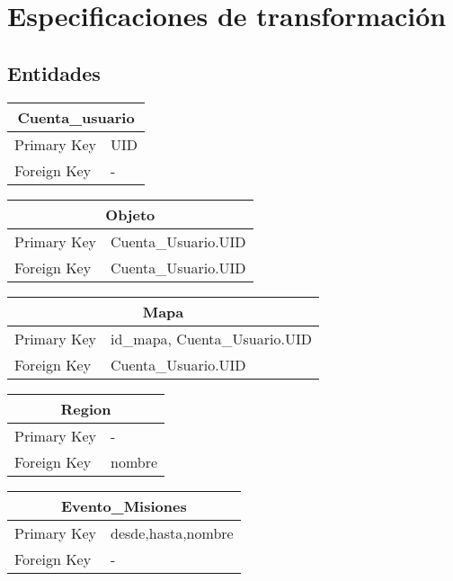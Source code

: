 \documentclass{report}
\begin{document}
\section{Especificaciones de transformación}
\subsection{Entidades}

\begin{center}    
    \begin{tabular}{|p{3cm}|p{5cm}|}
    \hline
    \multicolumn{2}{|c|}{Cuenta\_usuario} \\ 
    \hline
    \hline
    Primary Key& UID\\ 
    \hline
    Foreign Key & -\\ 
    \hline
    \end{tabular}
\end{center}

\begin{center}    
    \begin{tabular}{|p{3cm}|p{5cm}|}
    \hline
    \multicolumn{2}{|c|}{Objeto} \\ 
    \hline
    \hline
    Primary Key& Cuenta\_Usuario.UID\\ 
    \hline
    Foreign Key& Cuenta\_Usuario.UID\\ 
    \hline
    \end{tabular}
\end{center}

\begin{center}    
    \begin{tabular}{|p{3cm}|p{5cm}|}
    \hline
    \multicolumn{2}{|c|}{Mapa} \\ 
    \hline
    \hline
    Primary Key & id\_mapa, Cuenta\_Usuario.UID\\
    \hline
    Foreign Key& Cuenta\_Usuario.UID\\ 
    \hline
    \end{tabular}
\end{center}

\begin{center}    
    \begin{tabular}{|p{3cm}|p{5cm}|}
    \hline
    \multicolumn{2}{|c|}{Region} \\ 
    \hline
    \hline
    Primary Key& -\\ 
    \hline
    Foreign Key& nombre\\ 
    \hline
    \end{tabular}
\end{center}
\begin{center}    
    \begin{tabular}{|p{3cm}|p{5cm}|}
    \hline
    \multicolumn{2}{|c|}{Evento\_Misiones} \\ 
    \hline
    \hline
    Primary Key& desde,hasta,nombre\\ 
    \hline
    Foreign Key &-\\ 
    \hline
    \end{tabular}
\end{center}
\end{document}
